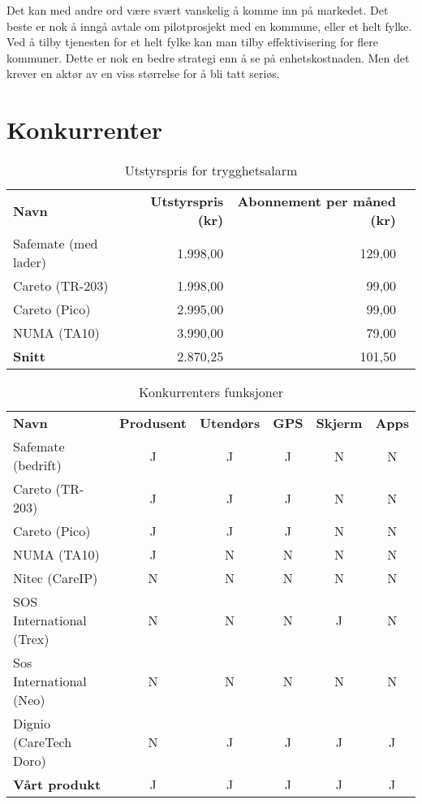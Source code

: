 Det kan med andre ord være svært vanskelig å komme inn på markedet. Det beste
er nok å inngå avtale om pilotprosjekt med en kommune, eller et helt fylke. Ved
å tilby tjenesten for et helt fylke kan man tilby effektivisering for flere
kommuner. Dette er nok en bedre strategi enn å se på enhetskostnaden. Men det
krever en aktør av en viss størrelse for å bli tatt seriøs.

\section{Konkurrenter}

\begin{table}
  \centering
  \begin{tabular}{lrrr}
    \textbf{Navn} &
    \textbf{Utstyrspris (kr)} &
    \textbf{Abonnement per måned (kr)}\\
    Safemate (med lader) & 1.998,00 & 129,00 \\
    Careto (TR-203)      & 1.998,00 &  99,00 \\
    Careto (Pico)        & 2.995,00 &  99,00 \\
    NUMA (TA10)          & 3.990,00 &  79,00 \\
    \textbf{Snitt}       & 2.870,25 & 101,50 \\
  \end{tabular}
  \caption{Utstyrspris for trygghetsalarm}
  \label{table.konkurranse.pris}
\end{table}

\begin{table}
  \centering
  \begin{tabular}{lccccc}
    \textbf{Navn} &
    \textbf{Produsent} &
    \textbf{Utendørs} &
    \textbf{GPS} &
    \textbf{Skjerm} &
    \textbf{Apps} \\

    Safemate (bedrift) & J & J  & J  & N  & N \\
    Careto (TR-203)    & J & J  & J  & N  & N \\
    Careto (Pico)      & J & J  & J  & N  & N \\
    NUMA (TA10)        & J & N  & N  & N  & N \\
    Nitec (CareIP)     & N & N  & N  & N  & N \\
    SOS International
    (Trex)             & N & N  & N  & J  & N \\
    Sos International
    (Neo)              & N & N  & N  & N  & N \\
    Dignio
    (CareTech Doro)    & N & J  & J  & J  & J \\
    \textbf{Vårt produkt}
                       & J & J  & J  & J  & J \\
  \end{tabular}
  \caption{Konkurrenters funksjoner}
  \label{table.konkurranse.funksjoner}
\end{table}

